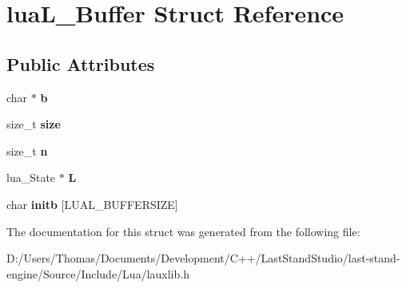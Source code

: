 \hypertarget{structluaL__Buffer}{}\section{lua\+L\+\_\+\+Buffer Struct Reference}
\label{structluaL__Buffer}
\subsection*{Public Attributes}
\begin{DoxyCompactItemize}
\item 
\hypertarget{structluaL__Buffer_ad519a6ef1557666cbdef35e5e8a4ef3b}{}char $\ast$ {\bfseries b}\label{structluaL__Buffer_ad519a6ef1557666cbdef35e5e8a4ef3b}

\item 
\hypertarget{structluaL__Buffer_a2d0288dac89591516c834328beee71cf}{}size\+\_\+t {\bfseries size}\label{structluaL__Buffer_a2d0288dac89591516c834328beee71cf}

\item 
\hypertarget{structluaL__Buffer_a85c23e8716842c83ee8e9d80f1652812}{}size\+\_\+t {\bfseries n}\label{structluaL__Buffer_a85c23e8716842c83ee8e9d80f1652812}

\item 
\hypertarget{structluaL__Buffer_a66ae63716768952c74910da4351886fb}{}lua\+\_\+\+State $\ast$ {\bfseries L}\label{structluaL__Buffer_a66ae63716768952c74910da4351886fb}

\item 
\hypertarget{structluaL__Buffer_a740a9839c94f115d3d5f574a066b9d49}{}char {\bfseries initb} \mbox{[}L\+U\+A\+L\+\_\+\+B\+U\+F\+F\+E\+R\+S\+I\+Z\+E\mbox{]}\label{structluaL__Buffer_a740a9839c94f115d3d5f574a066b9d49}

\end{DoxyCompactItemize}


The documentation for this struct was generated from the following file\+:\begin{DoxyCompactItemize}
\item 
D\+:/\+Users/\+Thomas/\+Documents/\+Development/\+C++/\+Last\+Stand\+Studio/last-\/stand-\/engine/\+Source/\+Include/\+Lua/lauxlib.\+h\end{DoxyCompactItemize}
